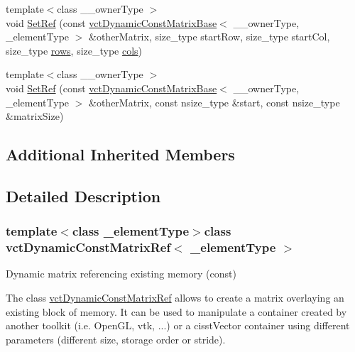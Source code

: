{\bf }\par
\begin{DoxyCompactItemize}
\item 
{\footnotesize template$<$class \+\_\+\+\_\+owner\+Type $>$ }\\void \hyperlink{classvct_dynamic_const_matrix_ref_a7f6da491ec4bbd91eda5829392fb15ae}{Set\+Ref} (const \hyperlink{classvct_dynamic_const_matrix_base}{vct\+Dynamic\+Const\+Matrix\+Base}$<$ \+\_\+\+\_\+owner\+Type, \+\_\+element\+Type $>$ \&other\+Matrix, size\+\_\+type start\+Row, size\+\_\+type start\+Col, size\+\_\+type \hyperlink{classvct_dynamic_const_matrix_base_a5eac13be2207ebeb8766cde379d73438}{rows}, size\+\_\+type \hyperlink{classvct_dynamic_const_matrix_base_aa6c51d41a100da49a7e7ac7edb20ecd9}{cols})
\item 
{\footnotesize template$<$class \+\_\+\+\_\+owner\+Type $>$ }\\void \hyperlink{classvct_dynamic_const_matrix_ref_ad26a85f8673438f3a4ccfac7b559ab86}{Set\+Ref} (const \hyperlink{classvct_dynamic_const_matrix_base}{vct\+Dynamic\+Const\+Matrix\+Base}$<$ \+\_\+\+\_\+owner\+Type, \+\_\+element\+Type $>$ \&other\+Matrix, const nsize\+\_\+type \&start, const nsize\+\_\+type \&matrix\+Size)
\end{DoxyCompactItemize}

\subsection*{Additional Inherited Members}


\subsection{Detailed Description}
\subsubsection*{template$<$class \+\_\+element\+Type$>$class vct\+Dynamic\+Const\+Matrix\+Ref$<$ \+\_\+element\+Type $>$}

Dynamic matrix referencing existing memory (const) 

The class \hyperlink{classvct_dynamic_const_matrix_ref}{vct\+Dynamic\+Const\+Matrix\+Ref} allows to create a matrix overlaying an existing block of memory. It can be used to manipulate a container created by another toolkit (i.\+e. Open\+G\+L, vtk, ...) or a cisst\+Vector container using different parameters (different size, storage order or stride).

